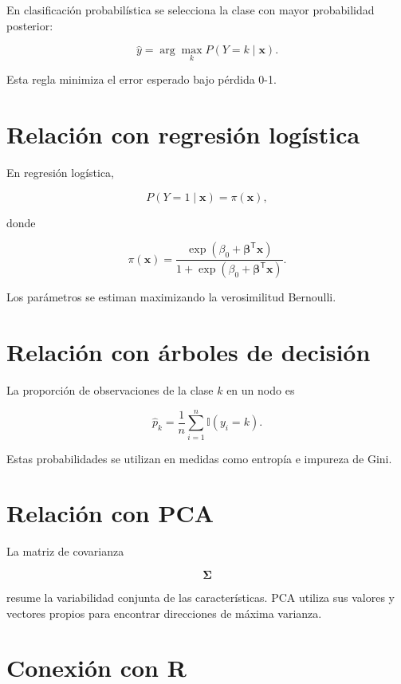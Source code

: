 \documentclass[
  spanish,
  11pt,
  letterpaper,
  DIV=11,
  numbers=noendperiod]{scrreprt}
\theoremstyle{definition}
\theoremstyle{plain}
\theoremstyle{definition}
\theoremstyle{remark}
\begin{document}
En clasificación probabilística se selecciona la clase con mayor
probabilidad posterior:

\[
\widehat{y}
=
\arg\max_{k}
P(Y=k\mid\mathbf{x}).
\]

Esta regla minimiza el error esperado bajo pérdida 0-1.

\section{Relación con regresión
logística}\label{relaciuxf3n-con-regresiuxf3n-loguxedstica}

En regresión logística,

\[
P(Y=1\mid\mathbf{x})
=
\pi(\mathbf{x}),
\]

donde

\[
\pi(\mathbf{x})
=
\frac{
\exp(\beta_0+\boldsymbol{\beta}^{\mathsf T}\mathbf{x})
}{
1+
\exp(\beta_0+\boldsymbol{\beta}^{\mathsf T}\mathbf{x})
}.
\]

Los parámetros se estiman maximizando la verosimilitud Bernoulli.

\section{Relación con árboles de
decisión}\label{relaciuxf3n-con-uxe1rboles-de-decisiuxf3n}

La proporción de observaciones de la clase \(k\) en un nodo es

\[
\widehat{p}_k
=
\frac{1}{n}
\sum_{i=1}^{n}
\mathbb{I}(y_i=k).
\]

Estas probabilidades se utilizan en medidas como entropía e impureza de
Gini.

\section{Relación con PCA}\label{relaciuxf3n-con-pca-1}

La matriz de covarianza

\[
\boldsymbol{\Sigma}
\]

resume la variabilidad conjunta de las características. PCA utiliza sus
valores y vectores propios para encontrar direcciones de máxima
varianza.

\section{Conexión con R}\label{conexiuxf3n-con-r-2}
\end{document}
